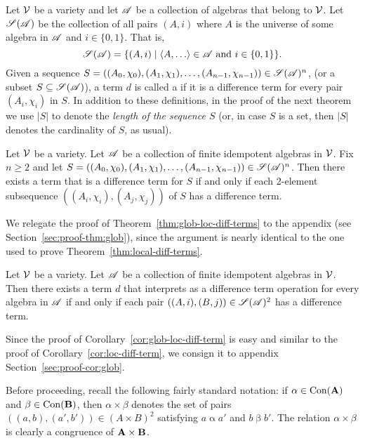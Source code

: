 Let $\mathcal{V}$ be a variety and let $\mathscr{A}$ be a collection of algebras that belong to $\mathcal{V}$.
Let $\mathscr{S}(\mathscr{A})$ be the collection of all pairs $(A, i)$ where $A$ is the universe
of some algebra in $\mathscr{A}$ and $i\in \{0,1\}$.  That is,
\[
\scS(\scA) = \{(A, i) \mid \<A, \dots\> \in \scA \text{ and } i \in \{0,1\}\}.
\]
Given a sequence
$S = ((A_0, \chi_0), (A_1, \chi_1), \dots,
(A_{n-1},\chi_{n-1})) \in \mathscr{S}(\mathscr{A})^n$,
(or a subset $S \subseteq \mathscr{S}(\mathscr{A})$),
a term $d$ is called a 
if it is a \glocal difference term for every pair $(A_i, \chi_i)$ in $S$.
In addition to these definitions, in the proof of the next theorem we use
$|S|$ to denote the \emph{length of the sequence $S$}
(or, in case $S$ is a set, then $|S|$ denotes the cardinality of $S$, as usual).
\begin{thm}
  \label{thm:glob-loc-diff-terms}
  Let $\mathcal{V}$ be a variety.  Let $\mathscr{A}$ be a collection of finite idempotent
  algebras in $\mathcal{V}$. Fix $n\geq 2$ and 
  let $S= ((A_0, \chi_0), (A_1, \chi_1), \dots, (A_{n-1}, \chi_{n-1}))\in \mathscr{S}(\mathscr{A})^n$.
  Then there exists a term that is a \glocal difference term for $S$
  if and only if each 2-element subsequence $((A_i,\chi_i), (A_j,\chi_j))$ of $S$
  has a \glocal difference term.
\end{thm}
We relegate the proof of Theorem~\ref{thm:glob-loc-diff-terms} 
to the appendix (see Section~\ref{sec:proof-thm:glob}), since the argument 
is nearly identical to the one used to prove Theorem~\ref{thm:local-diff-terms}. 

\begin{cor}
  \label{cor:glob-loc-diff-term}
  Let $\mathcal{V}$ be a variety.  Let $\mathscr{A}$ be a collection of finite idempotent
  algebras in $\mathcal{V}$. %
  Then there exists a term $d$ that interprets as a difference term operation
  for every algebra in $\mathscr{A}$
  if and only if each pair $((A,i), (B,j)) \in \mathscr{S}(\mathscr{A})^2$ has a \glocal
  difference term.
\end{cor}
Since the proof of Corollary~\ref{cor:glob-loc-diff-term}
is easy and similar to the proof
of Corollary~\ref{cor:loc-diff-term}, we consign it to 
appendix Section~\ref{sec:proof-cor:glob}.

Before proceeding, recall the following fairly standard notation:
if $\alpha \in \operatorname{Con}(\mathbf{A})$ and $\beta \in \operatorname{Con}(\mathbf{B})$, then
$\alpha \times \beta$ denotes the set of pairs $((a,b),(a',b'))\in (A\times B)^2$ satisfying
$a \mathrel{\alpha} a'$ and $b \mathrel{\beta} b'$.  The relation 
$\alpha \times \beta$ is clearly a congruence of $\mathbf{A} \times \mathbf{B}$.

